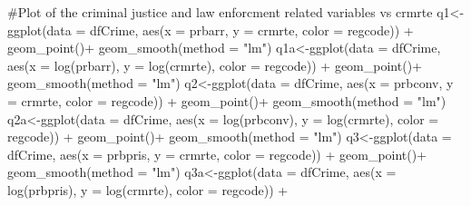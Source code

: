 \documentclass[]{article}
\newenvironment{Shaded}{}{}
\newcommand{\CommentTok}[1]{\textcolor[rgb]{0.00,0.50,0.00}{#1}}
\newcommand{\DataTypeTok}[1]{#1}
\newcommand{\KeywordTok}[1]{\textcolor[rgb]{0.00,0.00,1.00}{#1}}
\newcommand{\NormalTok}[1]{#1}
\newcommand{\OperatorTok}[1]{#1}
\newcommand{\StringTok}[1]{\textcolor[rgb]{0.00,0.50,0.50}{#1}}
\begin{document}
\begin{Shaded}
\begin{Highlighting}[]
\CommentTok{#Plot of the criminal justice and law enforcment related variables vs crmrte}
\NormalTok{q1<-}\KeywordTok{ggplot}\NormalTok{(}\DataTypeTok{data =}\NormalTok{ dfCrime, }\KeywordTok{aes}\NormalTok{(}\DataTypeTok{x =}\NormalTok{ prbarr, }\DataTypeTok{y =}\NormalTok{ crmrte, }\DataTypeTok{color =}\NormalTok{ regcode)) }\OperatorTok{+}
\StringTok{      }\KeywordTok{geom_point}\NormalTok{()}\OperatorTok{+}
\StringTok{  }\KeywordTok{geom_smooth}\NormalTok{(}\DataTypeTok{method =} \StringTok{"lm"}\NormalTok{)}
\NormalTok{q1a<-}\KeywordTok{ggplot}\NormalTok{(}\DataTypeTok{data =}\NormalTok{ dfCrime, }\KeywordTok{aes}\NormalTok{(}\DataTypeTok{x =} \KeywordTok{log}\NormalTok{(prbarr), }\DataTypeTok{y =} \KeywordTok{log}\NormalTok{(crmrte), }\DataTypeTok{color =}\NormalTok{ regcode)) }\OperatorTok{+}
\StringTok{      }\KeywordTok{geom_point}\NormalTok{()}\OperatorTok{+}
\StringTok{  }\KeywordTok{geom_smooth}\NormalTok{(}\DataTypeTok{method =} \StringTok{"lm"}\NormalTok{)}
\NormalTok{q2<-}\KeywordTok{ggplot}\NormalTok{(}\DataTypeTok{data =}\NormalTok{ dfCrime, }\KeywordTok{aes}\NormalTok{(}\DataTypeTok{x =}\NormalTok{ prbconv, }\DataTypeTok{y =}\NormalTok{ crmrte, }\DataTypeTok{color =}\NormalTok{ regcode)) }\OperatorTok{+}
\StringTok{      }\KeywordTok{geom_point}\NormalTok{()}\OperatorTok{+}
\StringTok{  }\KeywordTok{geom_smooth}\NormalTok{(}\DataTypeTok{method =} \StringTok{"lm"}\NormalTok{)}
\NormalTok{q2a<-}\KeywordTok{ggplot}\NormalTok{(}\DataTypeTok{data =}\NormalTok{ dfCrime, }\KeywordTok{aes}\NormalTok{(}\DataTypeTok{x =} \KeywordTok{log}\NormalTok{(prbconv), }\DataTypeTok{y =} \KeywordTok{log}\NormalTok{(crmrte), }\DataTypeTok{color =}\NormalTok{ regcode)) }\OperatorTok{+}
\StringTok{      }\KeywordTok{geom_point}\NormalTok{()}\OperatorTok{+}
\StringTok{  }\KeywordTok{geom_smooth}\NormalTok{(}\DataTypeTok{method =} \StringTok{"lm"}\NormalTok{)}
\NormalTok{q3<-}\KeywordTok{ggplot}\NormalTok{(}\DataTypeTok{data =}\NormalTok{ dfCrime, }\KeywordTok{aes}\NormalTok{(}\DataTypeTok{x =}\NormalTok{ prbpris, }\DataTypeTok{y =}\NormalTok{ crmrte, }\DataTypeTok{color =}\NormalTok{ regcode)) }\OperatorTok{+}
\StringTok{      }\KeywordTok{geom_point}\NormalTok{()}\OperatorTok{+}
\StringTok{  }\KeywordTok{geom_smooth}\NormalTok{(}\DataTypeTok{method =} \StringTok{"lm"}\NormalTok{)}
\NormalTok{q3a<-}\KeywordTok{ggplot}\NormalTok{(}\DataTypeTok{data =}\NormalTok{ dfCrime, }\KeywordTok{aes}\NormalTok{(}\DataTypeTok{x =} \KeywordTok{log}\NormalTok{(prbpris), }\DataTypeTok{y =} \KeywordTok{log}\NormalTok{(crmrte), }\DataTypeTok{color =}\NormalTok{ regcode)) }\OperatorTok{+}

\end{Highlighting}
\end{Shaded}
\end{document}

